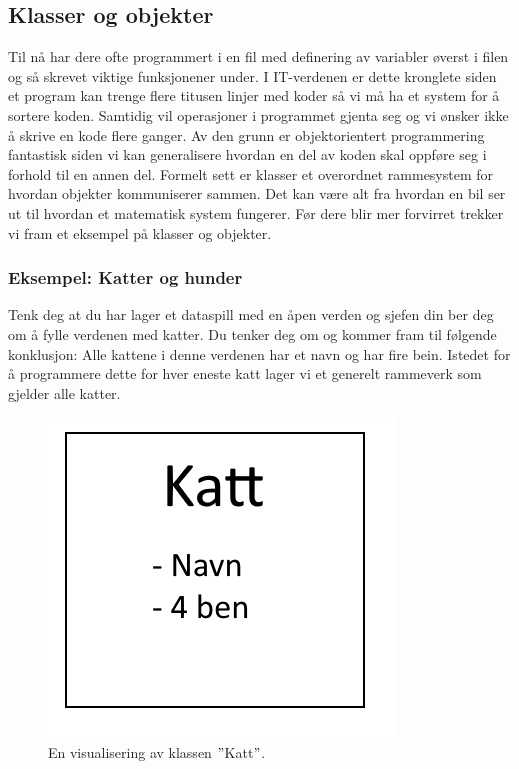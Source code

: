     


\subsection{Klasser og objekter}
Til nå har dere ofte programmert i en fil med definering av variabler øverst i filen og så skrevet viktige funksjonener under. I IT-verdenen er dette kronglete siden et program kan trenge flere titusen linjer med koder så vi må ha et system for å sortere koden. Samtidig vil operasjoner i programmet gjenta seg og vi ønsker ikke å skrive en kode flere ganger. Av den grunn er objektorientert programmering fantastisk siden vi kan generalisere hvordan en del av koden skal oppføre seg i forhold til en annen del. Formelt sett er klasser et overordnet rammesystem for hvordan objekter kommuniserer sammen. Det kan være alt fra hvordan en bil ser ut til hvordan et matematisk system fungerer. Før dere blir mer forvirret trekker vi fram et eksempel på klasser og objekter.

\subsubsection{Eksempel: Katter og hunder}
Tenk deg at du har lager et dataspill med en åpen verden og sjefen din ber deg om å fylle verdenen med katter. Du tenker deg om og kommer fram til følgende konklusjon: Alle kattene i denne verdenen har et navn og har fire bein. Istedet for å programmere dette for hver eneste katt lager vi et generelt rammeverk som gjelder alle katter.

\begin{figure}[H]
    \centering
    \includegraphics[scale=0.5]{Figures/Klasser_katt.png}
    \caption{En visualisering av klassen $"$Katt$"$.}
    \label{fig:Katte_boks}
\end{figure}

